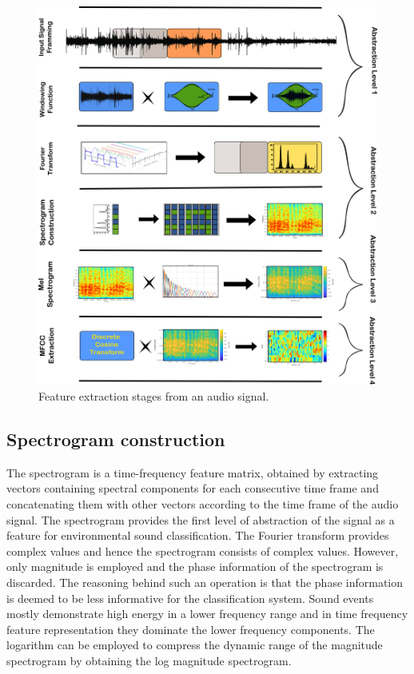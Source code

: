 \begin{figure}[htbp]
   \begin{center}
      \includegraphics[width=1\linewidth]{Chapitre1/figures/signalTransfromation.png}
   \end{center}
   \caption { Feature extraction stages from an audio signal.}
   \label{fig:signalTransformation}
\end{figure}



\subsection{Spectrogram construction}
\label{chapter:backroundSpectrogramConstruction}
The spectrogram is  a time-frequency feature matrix, obtained by extracting vectors containing spectral components for each consecutive time frame and concatenating them with other vectors according to the time frame of the audio signal. The spectrogram provides the first level of abstraction of the signal as a feature for environmental sound classification. The Fourier transform provides complex values and hence the spectrogram consists of complex values. However, only magnitude is employed and the phase information  of the spectrogram is discarded. The reasoning behind such an operation is that the phase information is deemed to be less informative for the classification system. Sound events mostly demonstrate high energy in a lower frequency range and in time frequency feature representation they dominate the lower frequency components. The logarithm can be employed to compress the dynamic range of the magnitude spectrogram by obtaining the log magnitude spectrogram. 

